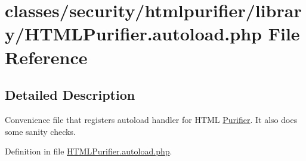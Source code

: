 \hypertarget{HTMLPurifier_8autoload_8php}{\section{classes/security/htmlpurifier/library/\+H\+T\+M\+L\+Purifier.autoload.\+php File Reference}
\label{HTMLPurifier_8autoload_8php}
}


\subsection{Detailed Description}
Convenience file that registers autoload handler for H\+T\+M\+L \hyperlink{classPurifier}{Purifier}. It also does some sanity checks. 

Definition in file \hyperlink{HTMLPurifier_8autoload_8php_source}{H\+T\+M\+L\+Purifier.\+autoload.\+php}.

